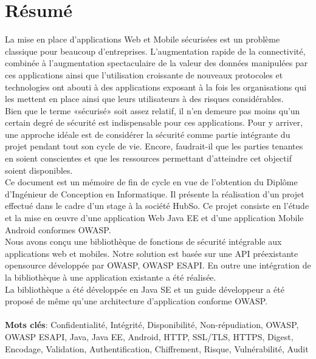 
\chapter*{Résumé}

La mise en place d'applications Web et Mobile sécurisées est un problème classique pour beaucoup d'entreprises. L’augmentation rapide de la connectivité, combinée à l’augmentation spectaculaire de la valeur des données manipulées par ces applications ainsi que l’utilisation croissante de nouveaux protocoles et technologies ont abouti à des applications exposant à la fois les organisations qui les mettent en place ainsi que leurs utilisateurs à des risques considérables.\\
Bien que le terme «sécurisé» soit assez relatif, il n'en demeure pas moins qu'un certain degré de sécurité est indispensable pour ces applications. Pour y arriver, une approche idéale est de considérer la sécurité comme partie intégrante du projet pendant tout son cycle de vie. Encore, faudrait-il que les parties tenantes en soient conscientes et que les ressources permettant d'atteindre cet objectif soient disponibles.\\
Ce document est un mémoire de fin de cycle en vue de l’obtention du Diplôme d’Ingénieur de Conception en Informatique. Il présente la réalisation d’un projet effectué dans le cadre d’un stage à la société HubSo. Ce projet consiste en l'étude et la mise en œuvre d'une application Web Java EE et d'une application Mobile Android conformes OWASP.\\
Nous avons conçu une bibliothèque de fonctions de sécurité intégrable aux applications web et mobiles. Notre solution est basée sur une API préexistante opensource développée par OWASP, OWASP ESAPI. En outre une intégration de la bibliothèque à une application existante a été réalisée.\\
La bibliothèque a été développée en Java SE et un guide développeur a été proposé de même qu'une architecture d'application conforme OWASP.\\ \\
\textbf{Mots clés}: Confidentialité, Intégrité, Disponibilité, Non-répudiation, OWASP, OWASP ESAPI, Java, Java EE, Android, HTTP, SSL/TLS, HTTPS, Digest, Encodage, Validation, Authentification, Chiffrement, Risque, Vulnérabilité, Audit



\clearpage
